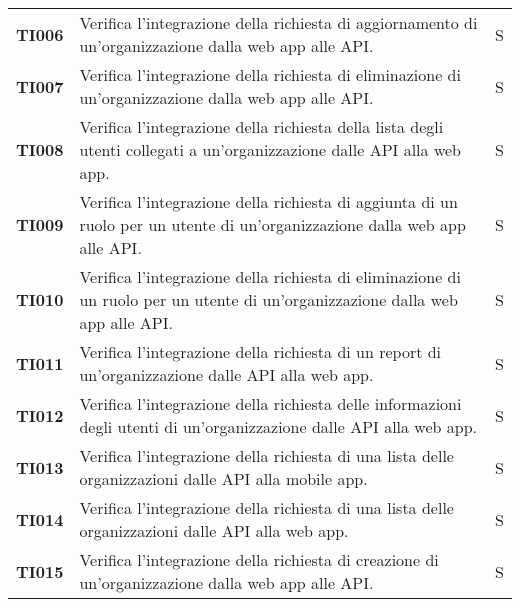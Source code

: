 \documentclass[../../piano-di-qualifica.tex]{subfiles}
\begin{document}
\begin{longtable}[H]{>{\centering\bfseries}m{3cm} >{}m{10cm} >{\centering\arraybackslash}m{3cm}}
  TI006                & Verifica l'integrazione della richiesta di aggiornamento di un'organizzazione dalla web app alle API\@.                                       & S                             \\

  TI007                & Verifica l'integrazione della richiesta di eliminazione di un'organizzazione dalla web app alle API\@.                                        & S                             \\

  TI008                & Verifica l'integrazione della richiesta della lista degli utenti collegati a un'organizzazione dalle API alla web app.                        & S                             \\

  TI009                & Verifica l'integrazione della richiesta di aggiunta di un ruolo per un utente di un'organizzazione dalla web app alle API\@.                  & S                             \\

  TI010               & Verifica l'integrazione della richiesta di eliminazione di un ruolo per un utente di un'organizzazione dalla web app alle API\@.              & S                             \\

  TI011               & Verifica l'integrazione della richiesta di un report di un'organizzazione dalle API alla web app.                                             & S                             \\

  TI012               & Verifica l'integrazione della richiesta delle informazioni degli utenti di un'organizzazione dalle API alla web app.                          & S                             \\

  TI013               & Verifica l'integrazione della richiesta di una lista delle organizzazioni dalle API alla mobile app.                                          & S                             \\

  TI014               & Verifica l'integrazione della richiesta di una lista delle organizzazioni dalle API alla web app.                                             & S                             \\

  TI015               & Verifica l'integrazione della richiesta di creazione di un'organizzazione dalla web app alle API\@.                                           & S                             \\


\end{longtable}
\end{document}

